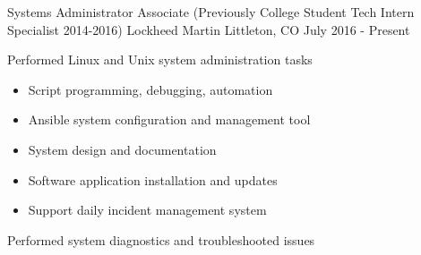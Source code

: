 


\begin{cventries}
\vspace{-.25em}
\cventry
{Systems Administrator Associate (Previously College Student Tech Intern Specialist 2014-2016)} %
{Lockheed Martin} %
{Littleton, CO} %
{July 2016 - Present} %
{ %
\begin{cvitems}
\item {Performed Linux and Unix system administration tasks}
  \begin{itemize}
  \item{Script programming, debugging, automation}
  \item{Ansible system configuration and management tool}
  \item{System design and documentation}
  \item{Software application installation and updates}
  \item{Support daily incident management system}
  \end{itemize}
\item {Performed system diagnostics and troubleshooted issues}
\end{cvitems}
}



\end{cventries}
